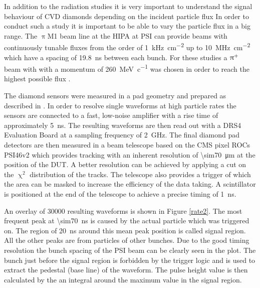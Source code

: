 In addition to the radiation studies it is very important to understand the signal behaviour of \ac{CVD} diamonds depending on the incident particle flux
In order to conduct such a study it is important to be able to vary the particle flux in a big range. The $\uppi$M1 beam line at the \ac{HIPA} at \ac{PSI} can provide beams with continuously tunable fluxes from the order of \SI{1}{\kilo\hertz\per\centi\meter^2} up to \SI{10}{\mega\hertz\per\centi\meter^2} which have a spacing of \SI{19.8}{\nano\second} between each bunch. For these studies a $\uppi^{\text{+}}$ beam with with a momentum of \SI{260}{\mega\electronvolt\per c}  was chosen in order to reach the highest possible flux \cite{pim1}.\par
The diamond sensors were measured in a pad geometry and prepared as described in \cite{rainer}. 
In order to resolve single waveforms at high particle rates the sensors are connected to a fast, low-noise amplifier with a rise time of approximately \SI{5}{\nano\second}. The resulting waveforms are then read out with a DRS4 Evaluation Board at a sampling frequency of \SI{2}{\giga\hertz}. The final diamond pad detectors are then measured in a beam telescope based on the CMS pixel \acp{ROC} PSI46v2 \cite{kornmayer} which provides tracking with an inherent resolution of \SI{\sim70}{\micro\meter}  at the position of the DUT. A better resolution can be achieved by applying a cut on the $\upchi^{2}$ distribution of the tracks. The telescope also provides a trigger of which the area can be masked to increase the efficiency of the data taking. A scintillator is positioned at the end of the telescope to achieve a precise timing of \SI{1}{\nano\second}.\par
An overlay of \num{30000} resulting waveforms is shown in Figure \vref{rate2}. The most frequent peak at \SI{\sim70}{\nano\second} is caused by the actual particle which was triggered on. The region of \SI{20}{\nano\second} around this mean peak position is called signal region. All the other peaks are from particles of other bunches. Due to the good timing resolution the bunch spacing of the \ac{PSI} beam can be clearly seen in the plot. The bunch just before the signal region is forbidden by the trigger logic and is used to extract the pedestal (base line) of the waveform. The pulse height value is then calculated by the an integral around the maximum value in the signal region.\par

